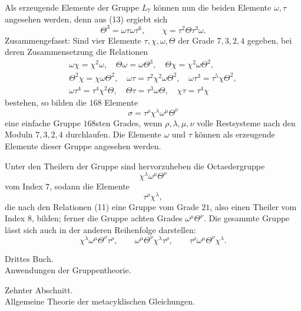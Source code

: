 \documentclass[11pt]{article}
\begin{document}
Als erzeugende Elemente der Gruppe $L_7$ können nun die beiden Elemente $\omega,\tau$ angesehen werden, denn aus (13) ergiebt sich
\begin{equation}
 \Theta^3=\omega\tau\omega\tau^6,
 \qquad
 \chi=\tau^2\Theta\tau^3\omega .
 \tag{15}
\end{equation}
Zusammengefasst: Sind vier Elemente $\tau,\chi,\omega,\Theta$ der Grade $7,3,2,4$ gegeben, bei deren Zusammensetzung die Relationen
\begin{equation}
\begin{gathered}
 \omega\chi=\chi^2\omega,
 \quad \Theta\omega=\omega\Theta^3,
 \quad \Theta\chi=\chi^2\omega\Theta^2,\\
 \Theta^2\chi=\chi\omega\Theta^2,
 \quad \omega\tau=\tau^2\chi^2\omega\Theta^2,
 \quad \omega\tau^3=\tau^5\chi\Theta^2,\\
 \omega\tau^4=\tau^4\chi^2\Theta,
 \quad \Theta\tau=\tau^3\omega\Theta,
 \quad \chi\tau=\tau^4\chi
\end{gathered}
\tag{16}
\end{equation}
bestehen, so bilden die $168$ Elemente
\begin{equation}
 \sigma=\tau^\rho\chi^\lambda\omega^\mu\Theta^\nu
 \tag{17}
\end{equation}
eine einfache Gruppe $168$sten Grades, wenn $\rho,\lambda,\mu,\nu$ volle Restsysteme nach den Moduln $7,3,2,4$ durchlaufen. Die Elemente $\omega$ und $\tau$ können als erzeugende Elemente dieser Gruppe angesehen werden.

Unter den Theilern der Gruppe sind hervorzuheben die Octaedergruppe
\[
 \chi^\lambda\omega^\mu\Theta^\nu
\]
vom Index $7$, sodann die Elemente
\[
 \tau^\rho\chi^\lambda,
\]
die nach den Relationen (11) eine Gruppe vom Grade $21$, also einen Theiler vom Index $8$, bilden; ferner die Gruppe achten Grades $\omega^\mu\Theta^\nu$. Die gesammte Gruppe lässt sich auch in der anderen Reihenfolge darstellen:
\[
 \chi^\lambda\omega^\mu\Theta^\nu\tau^\rho,
 \qquad
 \omega^\mu\Theta^\nu\chi^\lambda\tau^\rho,
 \qquad
 \tau^\rho\omega^\mu\Theta^\nu\chi^\lambda.
\]


\clearpage
\begin{center}
{\Large Drittes Buch.}\\[0.5em]
{\large Anwendungen der Gruppentheorie.}
\end{center}

\begin{center}
{\large Zehnter Abschnitt.}\\[0.4em]
{\large Allgemeine Theorie der metacyklischen Gleichungen.}
\end{center}
\end{document}

